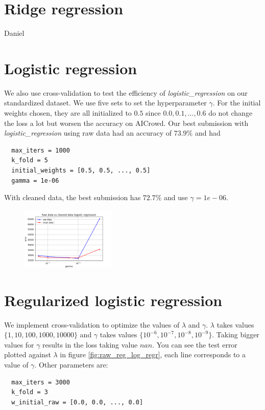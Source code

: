 \documentclass[11pt, a4paper, twoside]{article}
\begin{document}
\section{Ridge regression}
Daniel

\section{Logistic regression}
We also use cross-validation to test the efficiency of
\textit{logistic\_regression} on our standardized dataset.
We use five sets to set the hyperparameter $\gamma$.
For the initial weights chosen, they are all initialized to $0.5$ since $0.0, 0.1, ..., 0.6$ do not change the loss a lot but worsen the accuracy on AICrowd.
Our best submission with \textit{logistic\_regression} using raw data had an accuracy of $73.9\%$ and had 
\begin{lstlisting}
  max_iters = 1000
  k_fold = 5
  initial_weights = [0.5, 0.5, ..., 0.5]
  gamma = 1e-06
\end{lstlisting}
With cleaned data, the best submission has $72.7\%$ and use $\gamma = 1e-06$.

\begin{figure}
  \includegraphics[width=0.4\textwidth]{plots/raw_vs_clean_log_reg.png}
  \label{fig:raw_clean_log_reg}
\end{figure}


\section{Regularized logistic regression}
We implement cross-validation to optimize the values of $\lambda$ and $\gamma$. $\lambda$ takes values
$\{1,10,100,1000,10000\}$ and $\gamma$ takes values $\{10^{-6},10^{-7},10^{-8},10^{-9}\}$. Taking bigger
values for $\gamma$ results in the loss taking value $nan$. You can see the test error plotted against $\lambda$ in figure \ref{fig:raw_reg_log_regr}, each line corresponds to a value of $\gamma$. Other parameters are: 
\begin{lstlisting}
  max_iters = 3000
  k_fold = 3
  w_initial_raw = [0.0, 0.0, ..., 0.0]
\end{lstlisting}
\end{document}
